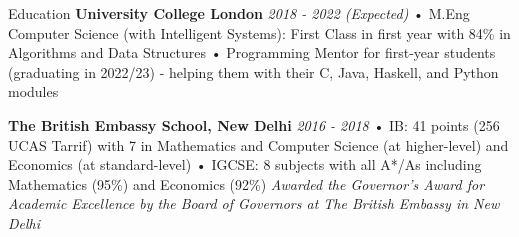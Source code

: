 \documentclass{resume}
\author{abir}
\begin{document}
\begin{rSection}{\small{Education}}
{\bf \footnotesize University College London}
\hfill {\footnotesize \textit{2018 - 2022 (Expected)}} \newline
\footnotesize{• M.Eng Computer Science (with Intelligent Systems): First Class in first year with 84\% in Algorithms and Data Structures}\newline
\footnotesize{• Programming Mentor for first-year students (graduating in 2022/23) - helping them with their C, Java, Haskell, and Python modules}


{\bf \footnotesize The British Embassy School, New Delhi}
\hfill {\footnotesize \textit{2016 - 2018}} \newline
\footnotesize{• IB: 41 points (256 UCAS Tarrif) with 7 in Mathematics and Computer Science (at higher-level) and Economics (at standard-level)}\newline
\footnotesize{• IGCSE: 8 subjects with all A*/As including Mathematics (95\%) and Economics (92\%)}\newline
\footnotesize{\textit{Awarded the Governor's Award for Academic Excellence by the Board of Governors at The British Embassy in New Delhi}}
\end{rSection}
\end{document}

